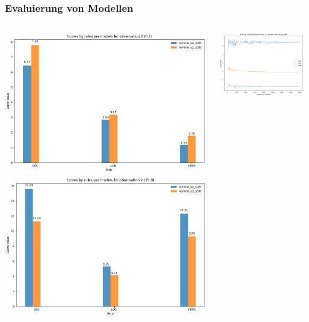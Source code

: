 \documentclass[18pt]{beamer}
\begin{document}
\begin{frame}
  \frametitle{Evaluierung von Modellen}
  \begin{columns}
    \begin{column}{0.5\textwidth}
      \includegraphics[scale=0.2]{images/cross_model_scoring_0}
      \includegraphics[scale=0.2]{images/cross_model_scoring_2}
    \end{column}
    \begin{column}{0.5\textwidth}
      \includegraphics[scale=0.23]{images/scroring_nomral_uo_std5_0}

\end{column}
\end{columns}
\end{frame}
\end{document}
